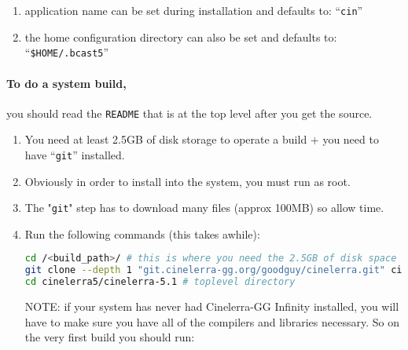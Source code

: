 
\begin{enumerate}
    \item 
        application name can be set during installation and defaults to: “\texttt{cin}”
    \item 
        the home configuration directory can also be set and defaults to:\\ “\texttt{\$HOME/.bcast5}”
\end{enumerate}

\paragraph{To do a system build,} you should read the \texttt{README} that is at the top level after you get the source.

\begin{enumerate}
    \item 
        You need at least 2.5GB of disk storage to operate a build + you need to have “\texttt{git}” installed.
    \item  Obviously in order to install into the system, you must run as root.
    \item  The "\texttt{git}" step has to download many files (approx 100MB) so allow time.
    \item  Run the following commands (this takes awhile):

        \begin{lstlisting}[language=bash]
cd /<build_path>/ # this is where you need the 2.5GB of disk space
git clone --depth 1 "git.cinelerra-gg.org/goodguy/cinelerra.git" cinelerra5
cd cinelerra5/cinelerra-5.1 # toplevel directory
        \end{lstlisting}
        NOTE: if your system has never had Cinelerra-GG Infinity installed, you will have to make sure you
        have all of the compilers and libraries necessary. So on the very first build you should run:


\end{enumerate}
